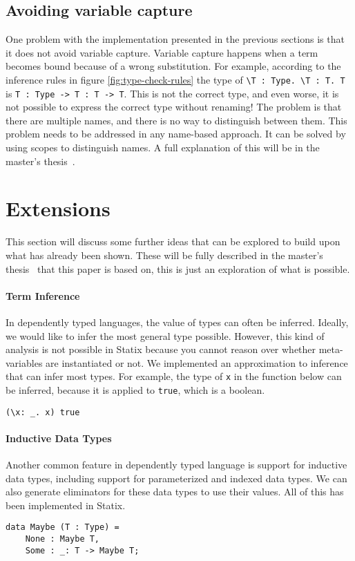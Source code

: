 \documentclass[a4paper,UKenglish,cleveref, autoref, thm-restate]{oasics-v2021}
\begin{document}
\subsection{Avoiding variable capture}
One problem with the implementation presented in the previous sections is that it does not avoid variable capture. Variable capture happens when a term becomes bound because of a wrong substitution. For example, according to the inference rules in figure \ref{fig:type-check-rules} the type of \verb|\T : Type. \T : T. T| is \verb|T : Type -> T : T -> T|. This is not the correct type, and even worse, it is not possible to express the correct type without renaming! The problem is that there are multiple names, and there is no way to distinguish between them. This problem needs to be addressed in any name-based approach. It can be solved by using scopes to distinguish names. A full explanation of this will be in the master's thesis~\cite{thesis}. 

\section{Extensions}
\label{sec:extensions}
This section will discuss some further ideas that can be explored to build upon what has already been shown. These will be fully described in the master's thesis~\cite{thesis} that this paper is based on, this is just an exploration of what is possible.

\paragraph*{Term Inference}
In dependently typed languages, the value of types can often be inferred. Ideally, we would like to infer the most general type possible. However, this kind of analysis is not possible in Statix because you cannot reason over whether meta-variables are instantiated or not. We implemented an approximation to inference that can infer most types. For example, the type of \verb|x| in the function below can be inferred, because it is applied to \verb|true|, which is a boolean.
\begin{lstlisting}
(\x: _. x) true
\end{lstlisting}

\paragraph*{Inductive Data Types}
Another common feature in dependently typed language is support for inductive data types, including support for parameterized and indexed data types. We can also generate eliminators for these data types to use their values. All of this has been implemented in Statix. 
\begin{lstlisting}
data Maybe (T : Type) = 
    None : Maybe T,
    Some : _: T -> Maybe T;
\end{lstlisting}
\end{document}
